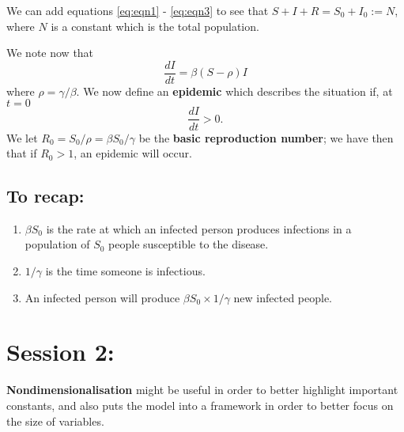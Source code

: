 \documentclass[a4paper,openany,nobib]{tufte-book}
\begin{document}
We can add equations \eqref{eq:eqn1} - \eqref{eq:eqn3} to see that $S+I+R=S_0+I_0 :=N$, where $N$ is a constant which is the total population.

We note now that \begin{equation}
	\frac{dI}{dt} = \beta \left( S-\rho \right)I 
\end{equation}
where $\rho = \gamma/\beta$.
We now define an \textbf{epidemic} which describes the situation if, at $t=0$
\begin{equation*}
	\frac{dI}{dt}> 0.
\end{equation*}
We let $R_0 =S_0 / \rho = \beta S_0 / \gamma$ be the \textbf{basic reproduction number}; we have then that if $R_0 >1$, an epidemic will occur.

\subsection{To recap:}%
\label{sub:To recap:}

\begin{enumerate}
	\item $\beta S_0$ is the rate at which an infected person produces infections in a population of $S_0$ people susceptible to the disease.
	\item $1/\gamma$ is the time someone is infectious.
	\item An infected person will produce $\beta S_0 \times 1/\gamma$ new infected people.
\end{enumerate}
\section{Session 2:}%
\label{sec:Session 2:}
\textbf{Nondimensionalisation}
might be useful in order to better highlight important constants, and also puts the model into a framework in order to better focus on the size of variables.
\end{document}
